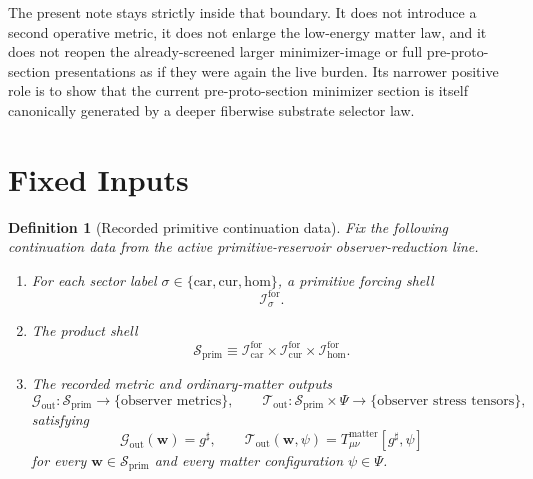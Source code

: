 \documentclass[11pt]{article}
\newcommand{\CompletedMetric}{g^{\sharp}}
\newcommand{\MatterSpace}{\Psi}
\newcommand{\Car}{\mathrm{car}}
\newcommand{\Cur}{\mathrm{cur}}
\newcommand{\Hom}{\mathrm{hom}}
\newcommand{\ForSpace}[1]{\mathcal I_{#1}^{\mathrm{for}}}
\newcommand{\PrimShell}{\mathcal S_{\mathrm{prim}}}
\newcommand{\MetricOut}{\mathscr G_{\mathrm{out}}}
\newcommand{\MatterOut}{\mathscr T_{\mathrm{out}}}
\newtheorem{definition}{Definition}
\begin{document}
The present note stays strictly inside that boundary. It does not introduce a second operative metric, it does not enlarge the low-energy matter law, and it does not reopen the already-screened larger minimizer-image or full pre-proto-section presentations as if they were again the live burden. Its narrower positive role is to show that the current pre-proto-section minimizer section is itself canonically generated by a deeper fiberwise substrate selector law.

\section{Fixed Inputs}

\begin{definition}[Recorded primitive continuation data]
\label{def:fixed}
Fix the following continuation data from the active primitive-reservoir observer-reduction line.
\begin{enumerate}
    \item For each sector label \(\sigma\in\{\Car,\Cur,\Hom\}\), a primitive forcing shell
    \[
    \ForSpace{\sigma}.
    \]
    \item The product shell
    \[
    \PrimShell
    \equiv
    \ForSpace{\Car}\times \ForSpace{\Cur}\times \ForSpace{\Hom}.
    \]
    \item The recorded metric and ordinary-matter outputs
    \[
    \MetricOut:\PrimShell\to\{\text{observer metrics}\},
    \qquad
    \MatterOut:\PrimShell\times\MatterSpace\to\{\text{observer stress tensors}\},
    \]
    satisfying
    \begin{equation}
    \MetricOut(\mathbf w)=\CompletedMetric,
    \qquad
    \MatterOut(\mathbf w,\psi)
    =
    T_{\mu\nu}^{\mathrm{matter}}[\CompletedMetric,\psi]
    \label{eq:fixedoutputs}
    \end{equation}
    for every \(\mathbf w\in\PrimShell\) and every matter configuration \(\psi\in\MatterSpace\).
\end{enumerate}
\end{definition}
\end{document}
